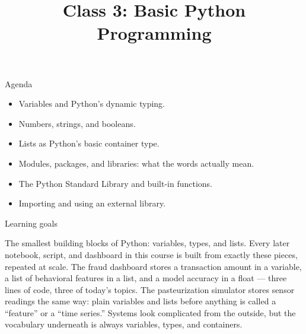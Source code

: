 

\title{Class 3: Basic Python Programming}
\author{\coursename}
\date{}



\frame{\titlepage \coursefooter}

\begin{frame}{Agenda}
\begin{itemize}
\item Variables and Python's dynamic typing.
\item Numbers, strings, and booleans.
\item Lists as Python's basic container type.
\item Modules, packages, and libraries: what the words actually mean.
\item The Python Standard Library and built-in functions.
\item Importing and using an external library.
\end{itemize}
\coursefooter
\end{frame}

\begin{frame}{Learning goals}
\coursefooter
\end{frame}

\coursecontextframe
{The smallest building blocks of Python: variables, types, and lists.}
{Every later notebook, script, and dashboard in this course is built from exactly these pieces, repeated at scale.}
{The fraud dashboard stores a transaction amount in a variable, a list of behavioral features in a list, and a model accuracy in a float --- three lines of code, three of today's topics.}
{The pasteurization simulator stores sensor readings the same way: plain variables and lists before anything is called a ``feature'' or a ``time series.''}
{Systems look complicated from the outside, but the vocabulary underneath is always variables, types, and containers.}

